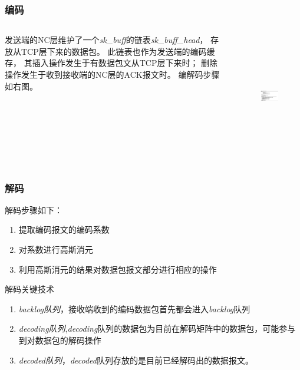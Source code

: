 \begin{frame}
	\frametitle{编码}
	\begin{columns}
		\begin{column}{0.4\textwidth}
			发送端的NC层维护了一个\emph{sk\_buff}的链表\emph{sk\_buff\_head}，
			存放从TCP层下来的数据包。
			此链表也作为发送端的编码缓存，
			其插入操作发生于有数据包文从TCP层下来时；
			删除操作发生于收到接收端的NC层的ACK报文时。
			编解码步骤如右图。
		\end{column}
		\begin{column}{0.6\textwidth}
			\vspace{-2.5em}
			\begin{figure}
				\includegraphics[height=5.5cm]{figures/encoding.eps}
			\end{figure}
		\end{column}
	\end{columns}
\end{frame}

\begin{frame}
	\frametitle{解码}
	解码步骤如下：
	\begin{enumerate}
		\item 提取编码报文的编码系数
		\item 对系数进行高斯消元
		\item 利用高斯消元的结果对数据包报文部分进行相应的操作
	\end{enumerate}
	\begin{block}{解码关键技术}
		\begin{enumerate}
			\item \emph{backlog队列}，接收端收到的编码数据包首先都会进入\emph{backlog}队列
			\item \emph{decoding队列},\emph{decoding}队列的数据包为目前在解码矩阵中的数据包，可能参与到对数据包的解码操作
			\item \emph{decoded队列}，\emph{decoded}队列存放的是目前已经解码出的数据报文。
		\end{enumerate}
	\end{block}
\end{frame}


